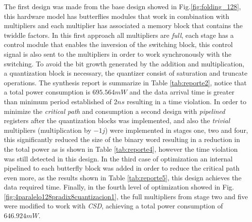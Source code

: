 \documentclass[journal,comsoc]{IEEEtran}
\begin{document}
The first design was made from the base design showed in Fig.\ref{fig:folding_128}, this hardware model has butterflies modules that work in combination with multipliers and each multiplier has associated a memory block that contains the twiddle factors. In this first approach all multipliers are \textit{full}, each stage has a control module that enables the inversion of the switching block, this control signal is also sent to the multipliers in order to work synchronously with the switching. To avoid the bit growth generated by the addition and multiplication, a quantization block is necessary, the quantizer consist of  saturation and truncate operations. The synthesis report is summarize in Table \ref{tab:reporte2}, notice that a total power consumption is $695.564 mW$ and the data arrival time is greater than minimum period established of $2ns$ resulting in a time violation.
In order to minimize the \textit{critical path} and consumption a second design with \textit{pipelined} registers after the quantization blocks was implemented, and also the \textit{trivial} multipliers (multiplication by $-1j$) were implemented in stages one, two and four, this significantly reduced the size of the binary word resulting in a reduction in the total power as is shown in Table \ref{tab:reporte4}, however the time violation was still detected in this design.
In the third case of optimization an internal pipelined to each butterfly block was added in order to reduce the critical path even more, as the results shown in Table \ref{tab:reporte5}, this design achieves the data required time.
Finally, in the fourth level of optimization showed in Fig.\ref{fig:4paralelo128pradix8cuantizacion1}, the full multipliers from stage two and five were modified to work with \textit{CSD}, achieving a total power consumption of $646.924 mW$. 





%
%
%
\end{document}
